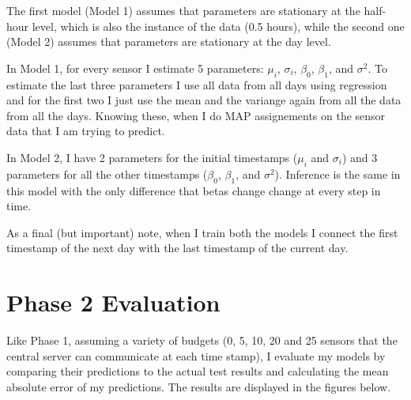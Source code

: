 \documentclass{article}
\begin{document}
The first model (Model 1) assumes that parameters
are stationary at the half-hour level, which is
also the instance of the data (0.5 hours),
while the second one (Model 2) assumes that
parameters are stationary at the day level.

In Model 1, for every sensor I estimate 5 parameters:
$\mu_i$, $\sigma_i$, $\beta_0$, $\beta_1$, and $\sigma^2$.
To estimate the last three parameters I use all data
from all days using regression and for the first two
I just use the mean and the variange again from all
the data from all the days. Knowing these, when I do
MAP assignements on the sensor data that I am trying
to predict.

In Model 2, I have 2 parameters for the initial
timestamps ($\mu_i$ and $\sigma_i$) and 3 parameters
for all the other timestamps ($\beta_0$, $\beta_1$,
and $\sigma^2$). Inference is the same in this model
with the only difference that betas change change at
every step in time.

As a final (but important) note, when I train both
the models I connect the first timestamp of the next
day with the last timestamp of the current day.

\section{Phase 2 Evaluation}

Like Phase 1,
assuming a variety of budgets (0, 5, 10, 20 and 25
sensors that the central server can communicate at
each time stamp), I evaluate my models by comparing
their predictions to the actual test results and
calculating the mean absolute error of my
predictions. The results are displayed in the figures
below.
\end{document}
